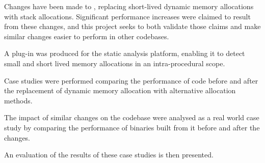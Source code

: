 Changes have been made to , replacing short-lived dynamic memory allocations with stack allocations. Significant performance increases were claimed to result from these changes, and this project seeks to both validate those claims and make similar changes easier to perform in other codebases.

A plug-in was produced for the  static analysis platform, enabling it to detect small and short lived memory allocations in an intra-procedural scope.

Case studies were performed comparing the performance of code before and after the replacement of dynamic memory allocation with alternative allocation methods.

The impact of similar changes on the  codebase were analysed as a real world case study by comparing the performance of binaries built from it before and after the changes. 

An evaluation of the results of these case studies is then presented.
